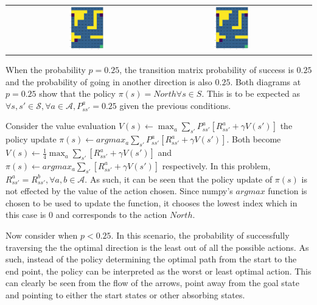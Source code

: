 \begin{center}
\begin{tabular}{c | c  c  c}
        & 
            \includegraphics[width=0.25\textwidth]{assets/dp/analysis/prob_0.25_gamma_0.8_value.png}
        &
            \includegraphics[width=0.25\textwidth]{assets/dp/analysis/prob_0.5_gamma_0.8_value.png}
    \end{tabular}        
\end{center}

When the probability $p = 0.25$, the transition matrix probability
of success is $0.25$ and the probability of going in another direction
is also $0.25$.
Both diagrams at $p = 0.25$ show that the policy $\pi(s) = North \forall s \in S$.
This is to be expected as
$ \forall s, s' \in \mathcal{S}, \forall a \in \mathcal{A}, P^a_{ss'} = 0.25$ given 
the previous conditions. 

Consider the value evaluation 
$V(s) \leftarrow \max_a \sum_{s'} P^a_{ss'}[R^a_{ss'} + \gamma V(s')]$
the policy update $\pi(s) \leftarrow argmax_a \sum_{s'} P^a_{ss'}[R^a_{ss'} + \gamma V(s')]$.
Both become $V(s) \leftarrow \frac{1}{4}\max_a \sum_{s'} [R^a_{ss'} + \gamma V(s')]$
and $\pi(s) \leftarrow argmax_a \sum_{s'} [R^a_{ss'} + \gamma V(s')]$
respectively.
In this problem, $R^a_{ss'} = R^b_{ss'}, \forall a, b \in \mathcal{A}$. 
As such, it can be seen that the policy update of $\pi(s)$ is 
not effected by the value of the action chosen. Since numpy's
$argmax$ function is chosen to be used to update the function, 
it chooses the lowest index which in this case is $0$ and corresponds
to the action $North$. 

Now consider when $p < 0.25$.
In this scenario, the probability of successfully traversing the the
optimal direction is the least out of all the possible actions.
As such, instead of the policy determining the optimal path from the
start to the end point, the policy can be interpreted as the worst
or least optimal action. This can clearly be seen from the flow 
of the arrows, point away from the goal state and pointing to either
the start states or other absorbing states. 

